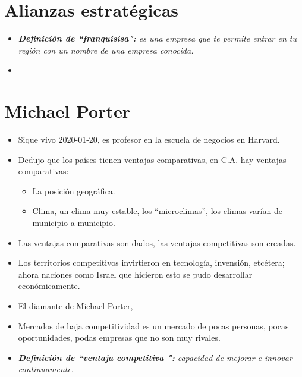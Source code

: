 
\section{Alianzas estratégicas}
\begin{itemize}
    \item \emph{\textbf{Definición de ``franquisisa":} es una empresa que te permite entrar en tu región con un nombre de una empresa conocida. }
    \item 
\end{itemize}


\section{Michael Porter}
\begin{itemize}
    \item Sique vivo 2020-01-20, es profesor en la escuela de negocios en Harvard. 
    \item Dedujo que los países tienen ventajas comparativas, en C.A. hay ventajas comparativas:
        \begin{itemize}
            \item La posición geográfica.
            \item Clima, un clima muy estable, los ``microclimas'', los climas varían de municipio a municipio.
        \end{itemize}
    
    \item Las ventajas comparativas son dados, las ventajas competitivas son creadas.
    \item Los territorios competitivos invirtieron en tecnología, invensión, etcétera; ahora naciones como Israel que hicieron esto se pudo desarrollar económicamente.
    \item El diamante de Michael Porter, 
    \item Mercados de baja competitividad es un mercado de pocas personas, pocas oportunidades, podas empresas que no son muy rivales.
    \item \emph{\textbf{Definición de ``ventaja competitiva ":} capacidad de mejorar e innovar continuamente}.
\end{itemize}
